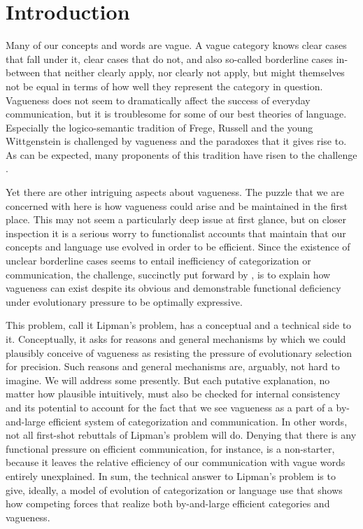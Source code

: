 \section{Introduction}

Many of our concepts and words are vague. A vague category knows clear
cases that fall under it, clear cases that do not, and also so-called
borderline cases in-between that neither clearly apply, nor clearly
not apply, but might themselves not be equal in terms of how well they
represent the category in question. Vagueness does not seem to
dramatically affect the success of everyday communication, but it is
troublesome for some of our best theories of language. Especially the
logico-semantic tradition of Frege, Russell and the young Wittgenstein
is challenged by vagueness and the paradoxes that it gives rise to. As
can be expected, many proponents of this tradition have risen to the
challenge
\citep[e.g.][]{Williamson1994:Vagueness,CobrerosEgre2012:Tolerant-Classi}.

Yet there are other intriguing aspects about vagueness. The
puzzle that we are concerned with here is how vagueness could arise
and be maintained in the first place. This may not seem a particularly
deep issue at first glance, but on closer inspection it is a serious
worry to functionalist accounts that maintain that our concepts and
language use evolved in order to be efficient. Since the existence of
unclear borderline cases seems to entail inefficiency of
categorization or communication, the challenge, succinctly put forward
by \citet{Lipman2009:Why-is-Language}, is to explain how vagueness can
exist despite its obvious and demonstrable functional deficiency under
evolutionary pressure to be optimally expressive.

This problem, call it Lipman's problem, has a conceptual and a
technical side to it. Conceptually, it asks for reasons and general
mechanisms by which we could plausibly conceive of vagueness as
resisting the pressure of evolutionary selection for precision. Such
reasons and general mechanisms are, arguably, not hard to imagine. We
will address some presently. But each putative explanation, no matter
how plausible intuitively, must also be checked for internal
consistency and its potential to account for the fact that we see
vagueness as a part of a by-and-large efficient system of
categorization and communication. In other words, not all first-shot
rebuttals of Lipman's problem will do. Denying that there is any
functional pressure on efficient communication, for instance, is a
non-starter, because it leaves the relative efficiency of our
communication with vague words entirely unexplained. In sum, the
technical answer to Lipman's problem is to give, ideally, a model of
evolution of categorization or language use that shows how competing
forces that realize both by-and-large efficient categories and
vagueness.

